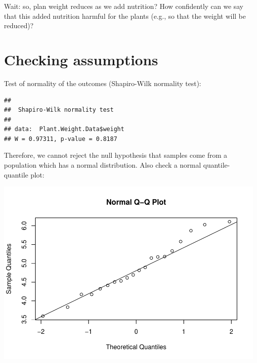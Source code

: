 \documentclass[
]{book}
\newenvironment{Shaded}{\begin{snugshade}}{\end{snugshade}}
\newcommand{\FunctionTok}[1]{\textcolor[rgb]{0.00,0.00,0.00}{#1}}
\newcommand{\NormalTok}[1]{#1}
\newcommand{\SpecialCharTok}[1]{\textcolor[rgb]{0.00,0.00,0.00}{#1}}
\begin{document}
Wait: so, plan weight reduces as we add nutrition? How confidently can we say that this added nutrition harmful for the plants (e.g., so that the weight will be reduced)?

\hypertarget{checking-assumptions}{%
\section{Checking assumptions}\label{checking-assumptions}}

Test of normality of the outcomes (Shapiro-Wilk normality test):

\begin{Shaded}
\end{Shaded}

\begin{verbatim}
## 
##  Shapiro-Wilk normality test
## 
## data:  Plant.Weight.Data$weight
## W = 0.97311, p-value = 0.8187
\end{verbatim}

Therefore, we cannot reject the null hypothesis that samples come from a population which has a normal distribution. Also check a normal quantile-quantile plot:

\begin{Shaded}
\end{Shaded}

\includegraphics{SurveyBook_files/figure-latex/testing11-1.pdf}
\end{document}
